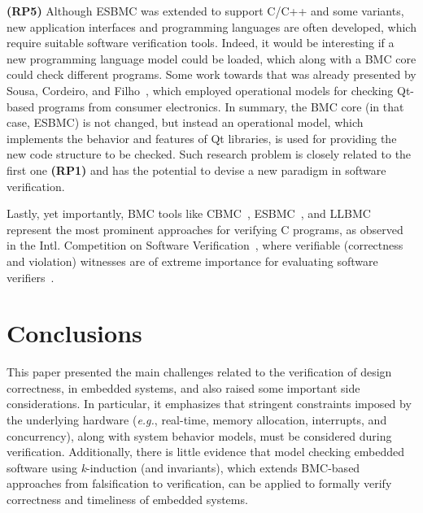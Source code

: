 \documentclass{acm_sen_article}
\begin{document}
{\textbf{(RP5)} Although ESBMC \cite{Cordeiro12} was extended to support C/C++ and some variants, new application interfaces and programming languages are often developed, which require suitable software verification tools. Indeed, it would be interesting if a new programming language model could be loaded, which along with a BMC core could check different programs. Some work towards that was already presented by Sousa, Cordeiro, and Filho~\cite{Garcia16}, which employed operational models for checking Qt-based programs from consumer electronics. In summary, the BMC core (in that case, ESBMC) is not changed, but instead an operational model, which implements the behavior and features of Qt libraries, is used for providing the new code structure to be checked. Such research problem is closely related to the first one \textbf{(RP1)} and has the potential to devise a new paradigm in software verification.

Lastly, yet importantly, BMC tools like CBMC~\cite{Clarke04}, ESBMC~\cite{MorseCNF13,MorseRCN014}, and LLBMC~\cite{MerzFS12} represent the most prominent approaches for verifying C programs, as observed in the Intl. Competition on Software Verification~\cite{Beyer14,BeyerSVCOMP15}, where verifiable (correctness and violation) witnesses are of extreme importance for evaluating software verifiers~\cite{BeyerW15,RochaIFM12}.




\section{Conclusions}
\label{conclusions}

This paper presented the main challenges related to the verification of design correctness, in embedded systems, and also raised some important side considerations. In particular, it emphasizes that stringent constraints imposed by the underlying hardware ({\it e.g.}, real-time, memory allocation, interrupts, and concurrency), along with system behavior models, must be considered during verification. Additionally, there is little evidence that model checking embedded software using \textit{k}-induction (and invariants), which
extends BMC-based approaches from falsification to verification, can be applied to formally verify correctness and timeliness of embedded systems. 

}
\end{document}
